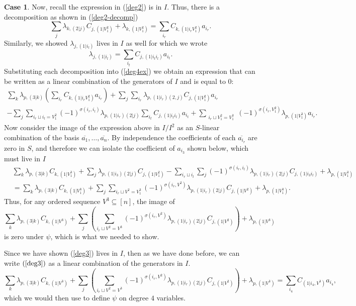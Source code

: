 \documentclass{amsart}
\theoremstyle{definition}
\newtheorem{case}[theorem]{Case}
\theoremstyle{remark}
\begin{document}
\begin{case}
 Now, recall the expression in (\ref{deg2}) is in $I$. Thus, there is a decomposition as shown in (\ref{deg2-decomp})
\[
\sum_j\lambda_{k,(2|j)}C_{j,(1|V^2_1)} + \lambda_{k,(1|V^2_1)}= \sum_{i_r}C_{k,(1|i_rV^2_1)}a_{i_r}.
\]
Similarly, we showed $\lambda_{j,(1|i_l)}$ lives in $I$ as well for which we wrote 
\[
\lambda_{j,(1|i_l)}=\sum_{i_t}C_{j,(1|i_ti_l)}a_{i_t}.
\]
Substituting each decomposition into (\ref{deg4ex}) we obtain an expression that can be written as a linear combination of the generators of $I$ and is equal to $0$:
\begin{multline*}
    \sum_{k}\lambda_{p,(3|k)}\left( \sum_{i_r}C_{k,(1|i_rV^2_1)}a_{i_r}\right) + \sum_j\sum_{i_r} \lambda_{p,(1|i_r)(2,j)}C_{j,(1|V^2_1)}a_{i_r}\\
    -\sum_j\sum_{i_r\sqcup i_l=V_1^2}(-1)^{\sigma(i_r,i_l)}\lambda_{p,(1|i_r)(2|j)}\sum_{i_t}C_{j,(1|i_ti_l)}a_{i_t} + \sum_{\substack{ i_r\sqcup V_1^2= V^3_1}}(-1)^{\sigma(i_r,V^2_1)}\lambda_{p,(1|V^3_1)}a_{i_r}.
\end{multline*}
Now consider the image of the expression above in $I/I^2$ as an $S$-linear combination of the basis $\overline{a_1}, \ldots , \overline{a_n}$. By independence the coefficients of each $\overline{a_{i_r}}$ are zero in $S$, and therefore we can isolate the coefficient of $a_{i_3}$ shown below, which must live in $I$
\begin{align*}
&\sum_k \lambda_{p,(3|k)}C_{k,(1|V_1^3)} + \sum_{j}\lambda_{p,(1|i_3)(2|j)}C_{j,(1|V_1^2)} -\sum_{i_r \sqcup i_l} \sum_{j} (-1)^{\sigma(i_r,i_l)}\lambda_{p,(1|i_r)(2|j)}C_{j,(1|i_3i_l)}+\lambda_{p,(1|V_1^3)}\\
&= \sum_{k}\lambda_{p,(3|k)}C_{k,(1|V^3_1)} + \sum_{j}\sum_{i_r \sqcup V^2 = V_1^3} (-1)^{\sigma(i_r,V^2
)}\lambda_{p, (1|i_r)(2|j)}C_{j,(1|V^2)} + \lambda_{p,(1|V_1^3)}.
\end{align*}
Thus, for any ordered sequence $V^3 \subseteq [n]$, the image of  
\begin{equation}
\label{deg3}
\sum_{k}\lambda_{p,(3|k)}C_{k,(1|V^3)} + \sum_{j}\left(\sum_{i_r \sqcup V^2 = V^3} (-1)^{\sigma(i_r,V^2
)}\lambda_{p, (1|i_r)(2|j)}C_{j,(1|V^2)}\right) + \lambda_{p,(1|V^3)}
\end{equation}
is zero under $\psi$, which is what we needed to show.

Since we have shown (\ref{deg3}) lives in $I$, then as we have done before, we can write $(\ref{deg3})$ as a linear combination of the generators in $I$.
\begin{equation}
    \sum_{k}\lambda_{p,(3|k)}C_{k,(1|V^3)} + \sum_{j} \left(\sum_{i_r \sqcup V^2 = V^3} (-1)^{\sigma(i_r,V^2
)}\lambda_{p, (1|i_r)(2|j)}C_{j,(1|V^2)} \right)+ \lambda_{p,(1|V^3)} = \sum_{i_4}C_{(1|i_4,V^3)}a_{i_4},
\end{equation}
which we would then use to define $\psi$ on degree $4$ variables.

\end{case}
\end{document}

